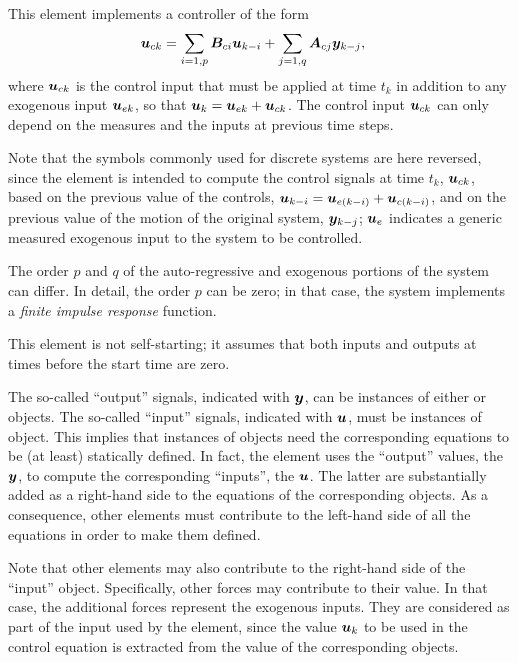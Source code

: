 This element implements a controller of the form
\begin{align}
	\boldsymbol{u}_{ck}
	&= \sum_{i=1,p} \boldsymbol{B}_{ci} \boldsymbol{u}_{k - i}
	+ \sum_{j=1,q} \boldsymbol{A}_{cj} \boldsymbol{y}_{k - j} ,
\end{align}
where $\boldsymbol{u}_{ck}$ is the control input that must be applied
at time $t_k$ in addition to any exogenous input $\boldsymbol{u}_{ek}$,
so that $\boldsymbol{u}_k = \boldsymbol{u}_{ek} + \boldsymbol{u}_{ck}$.
The control input $\boldsymbol{u}_{ck}$ can only depend on the measures
and the inputs at previous time steps.

Note that the symbols commonly used for discrete systems
are here reversed, since the element is intended to compute
the control signals at time $t_k$, $\boldsymbol{u}_{ck}$,
based on the previous value of the controls,
$\boldsymbol{u}_{k-i} = \boldsymbol{u}_{e(k - i)} + \boldsymbol{u}_{c(k - i)}$,
and on the previous value of the motion of the original system,
$\boldsymbol{y}_{k-j}$;
$\boldsymbol{u}_e$ indicates a generic measured exogenous input
to the system to be controlled.

The order $p$ and $q$ of the auto-regressive and exogenous portions
of the system can differ.
In detail, the order $p$ can be zero; in that case, the system
implements a \emph{finite impulse response} function.

This element is not self-starting; it assumes that both
inputs and outputs at times before the start time are zero.

The so-called ``output'' signals, indicated with $\boldsymbol{y}$,
can be instances of either  or  objects.
The so-called ``input'' signals, indicated with $\boldsymbol{u}$,
must be instances of  object.
This implies that instances of  objects
need the corresponding equations to be (at least) statically defined.
In fact, the  element uses the ``output''
 values, the $\boldsymbol{y}$, to compute the corresponding
``inputs'', the $\boldsymbol{u}$.
The latter are substantially added as a right-hand side
to the equations of the corresponding  objects.
As a consequence, other elements must contribute to the left-hand side
of all the  equations in order to make them defined.

Note that other elements may also contribute to the right-hand side
of the ``input''  object.
Specifically, other  forces may contribute to their value.
In that case, the additional forces represent the exogenous inputs.
They are considered as part of the input used by the 
element, since the value $\boldsymbol{u}_k$ to be used in the control equation
is extracted from the value of the corresponding  objects.

